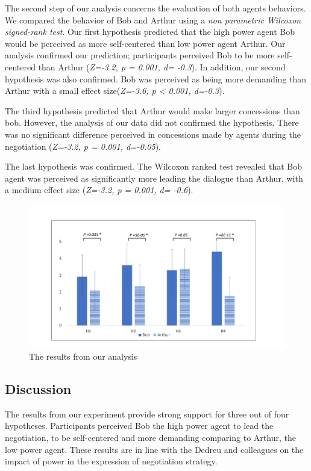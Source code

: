 \documentclass[runningheads,a4paper]{llncs}
\begin{document}
		The second step of our analysis concerns the evaluation of both agents behaviors. We compared the behavior of Bob and Arthur using a \textit{non parametric Wilcoxon signed-rank test}. Our first hypothesis predicted that the high power agent Bob would be perceived as more self-centered than low power agent Arthur. Our analysis confirmed our prediction; participants perceived Bob to be more self-centered than Arthur (\emph{Z=-3.2, p = 0.001, d= -0.3}). In addition, our second hypothesis was also confirmed. Bob was perceived as being more demanding than Arthur with a small effect size(\emph{Z=-3.6, p < 0.001, d=-0.3}). 
		
		The third hypothesis predicted that Arthur would make larger concessions than bob. However, the analysis of our data did not confirmed the hypothesis. There was no significant difference perceived in concessions made by agents during the negotiation (\emph{Z=-3.2, p = 0.001, d=-0.05}).
		
		The last hypothesis was confirmed. The Wilcoxon ranked test revealed that Bob agent was perceived as significantly more leading the dialogue than Arthur, with a medium effect size (\emph{Z=-3.2, p = 0.001, d= -0.6}).
			\begin{figure}[h]
				\centering
				\includegraphics[width=\textwidth,height=0.42\textheight]{graphs/res.pdf}
				\caption{The results from our analysis}
				\label{res}
			\end{figure}
		\subsection{Discussion}
		
		The results from our experiment provide strong support for three out of four hypotheses. Participants perceived Bob the high power agent to lead the negotiation, to be self-centered and more demanding comparing to Arthur, the low power agent. These results are in line with the Dedreu and colleagues on the impact of power in the expression of negotiation strategy.  
		
\end{document}
